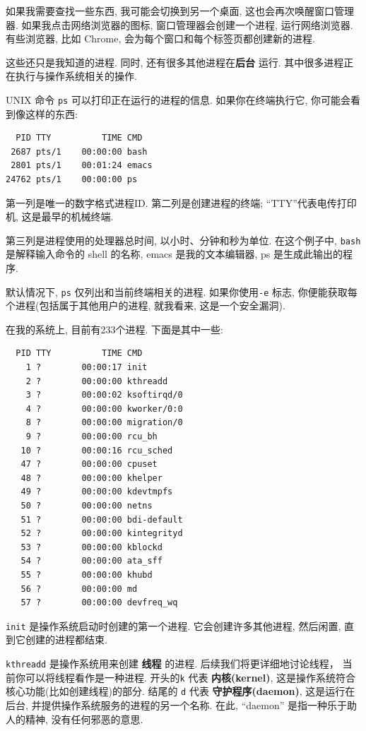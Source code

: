 \documentclass[12pt]{book}
\begin{document}
{如果我需要查找一些东西, 我可能会切换到另一个桌面,
这也会再次唤醒窗口管理器.
如果我点击网络浏览器的图标, 窗口管理器会创建一个进程, 运行网络浏览器.
有些浏览器, 比如 Chrome, 会为每个窗口和每个标签页都创建新的进程.

这些还只是我知道的进程.
同时, 还有很多其他进程在{\bf 后台} 运行.
其中很多进程正在执行与操作系统相关的操作.

UNIX 命令 {\tt ps} 可以打印正在运行的进程的信息.
如果你在终端执行它, 你可能会看到像这样的东西:

\begin{verbatim}
  PID TTY          TIME CMD
 2687 pts/1    00:00:00 bash
 2801 pts/1    00:01:24 emacs
24762 pts/1    00:00:00 ps
\end{verbatim}

第一列是唯一的数字格式进程ID.
第二列是创建进程的终端; 
``TTY''代表电传打印机, 这是最早的机械终端.

第三列是进程使用的处理器总时间, 以小时、分钟和秒为单位.
在这个例子中, {\tt bash} 是解释输入命令的 shell 的名称,
emacs 是我的文本编辑器, ps 是生成此输出的程序.

默认情况下, {\tt ps} 仅列出和当前终端相关的进程.
如果你使用{\tt -e} 标志, 你便能获取每个进程(包括属于其他用户的进程,
就我看来, 这是一个安全漏洞).

在我的系统上, 目前有233个进程.
下面是其中一些:

\begin{verbatim}
  PID TTY          TIME CMD
    1 ?        00:00:17 init
    2 ?        00:00:00 kthreadd
    3 ?        00:00:02 ksoftirqd/0
    4 ?        00:00:00 kworker/0:0
    8 ?        00:00:00 migration/0
    9 ?        00:00:00 rcu_bh
   10 ?        00:00:16 rcu_sched
   47 ?        00:00:00 cpuset
   48 ?        00:00:00 khelper
   49 ?        00:00:00 kdevtmpfs
   50 ?        00:00:00 netns
   51 ?        00:00:00 bdi-default
   52 ?        00:00:00 kintegrityd
   53 ?        00:00:00 kblockd
   54 ?        00:00:00 ata_sff
   55 ?        00:00:00 khubd
   56 ?        00:00:00 md
   57 ?        00:00:00 devfreq_wq
\end{verbatim}

{\tt init} 是操作系统启动时创建的第一个进程.
它会创建许多其他进程, 然后闲置, 
直到它创建的进程都结束.

{\tt kthreadd} 是操作系统用来创建 {\bf 线程} 的进程.
后续我们将更详细地讨论线程， 当前你可以将线程看作是一种进程.
开头的{\tt k} 代表 {\bf 内核(kernel)},
这是操作系统符合核心功能(比如创建线程)的部分.
结尾的 {\tt d} 代表 {\bf 守护程序(daemon)},
这是运行在后台, 并提供操作系统服务的进程的另一个名称.
在此, ``daemon'' 是指一种乐于助人的精神, 没有任何邪恶的意思.
 
}
\end{document}
